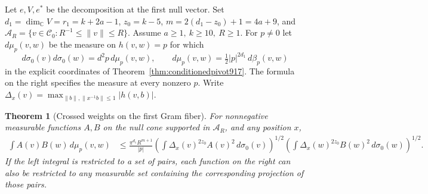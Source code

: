 \documentclass[a4paper,11pt]{article}
\newtheorem{theorem}[proposition]{Theorem}
\theoremstyle{definition}
\theoremstyle{remark}
\numberwithin{equation}{section}
\begin{document}
Let \(e,V,e^*\) be the decomposition at the first null vector.
Set \(d_1=\dim_{\mathbb C}V=r_1=k+2a-1\),
\(z_0=k-5\), \(m=2(d_1-z_0)+1=4a+9\), and
\(\mathcal A_R=\{v\in\mathcal C_0:R^{-1}\le\|v\|\le R\}\).
Assume \(a\ge1,\ k\ge 10,\ R\ge1\). For \(p\ne0\) let
\(d\mu_p(v,w)\) be the measure on \(h(v,w)=p\) for which
\[
  d\sigma_0(v)d\sigma_0(w)=d^2p\,d\mu_p(v,w),\qquad
  d\mu_p(v,w)=\tfrac12 |p|^{2d_1}\,d\beta_p(v,w)
\]
in the explicit coordinates of Theorem~\ref{thm:conditionedpivot917}.
The formula on the right specifies the measure at every nonzero
\(p\). Write
\(\Delta_x(v)=\max_{\|b\|,\|x^{-1}b\|\le1}|h(v,b)|\).

\begin{theorem}[Crossed weights on the first Gram fiber]
\leavevmode\label{thm:crossfiber919}
For nonnegative measurable functions \(A,B\) on the null cone
supported in \(\mathcal A_R\), and any position \(x\),
\begin{align}
 \int A(v)B(w)\,d\mu_p(v,w)
 &\le
 \frac{\pi^{d_1}R^{m+1}}{|p|}
 \left(\int \Delta_x(v)^{2z_0} A(v)^2\,d\sigma_0(v)\right)^{1/2}
 \left(\int \Delta_x(w)^{2z_0} B(w)^2\,d\sigma_0(w)\right)^{1/2}.
 \label{eq:crossfiber919}
\end{align}
If the left integral is restricted to a set of pairs, each
function on the right can also be restricted to any measurable
set containing the corresponding projection of those pairs.
\end{theorem}
\end{document}
